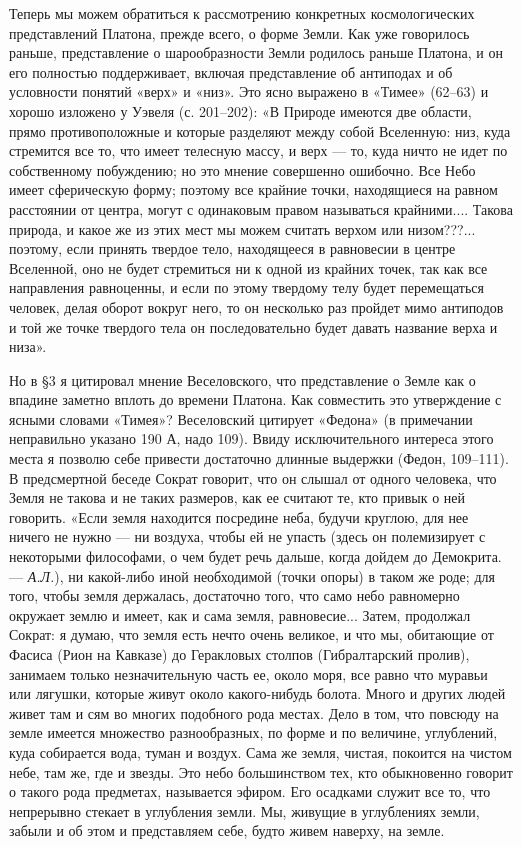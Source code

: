Теперь мы  можем обратиться к рассмотрению  конкретных космологических
представлений Платона, прежде всего, о форме Земли. Как уже говорилось
раньше, представление о шарообразности  Земли родилось раньше Платона,
и он его полностью поддерживает,  включая представление об антиподах и
об  условности понятий  «верх» и  «низ». Это  ясно выражено  в «Тимее»
(62--63) и хорошо изложено у  Уэвеля (с. 201--202): «В Природе имеются
две  области, прямо  противоположные и  которые разделяют  между собой
Вселенную: низ,  куда стремится  все то, что  имеет телесную  массу, и
верх ---  то, куда ничто  не идет  по собственному побуждению;  но это
мнение совершенно ошибочно. Все  Небо имеет сферическую форму; поэтому
все крайние точки, находящиеся на равном расстоянии от центра, могут с
одинаковым правом  называться крайними.... Такова природа,  и какое же
из этих  мест мы  можем считать верхом  или низом???...  поэтому, если
принять  твердое тело,  находящееся в  равновесии в  центре Вселенной,
оно  не  будет  стремиться  ни  к одной  из  крайних  точек,  так  как
все  направления  равноценны, и  если  по  этому твердому  телу  будет
перемещаться человек,  делая оборот вокруг  него, то он  несколько раз
пройдет мимо антиподов и той же точке твердого тела он последовательно
будет давать название верха и низа».

Но в §3 я цитировал мнение Веселовского, что представление о Земле как
о  впадине  заметно вплоть  до  времени  Платона. Как  совместить  это
утверждение с ясными словами «Тимея»? Веселовский цитирует «Федона» (в
примечании неправильно указано 190 А, надо 109). Ввиду исключительного
интереса  этого  места  я  позволю себе  привести  достаточно  длинные
выдержки (Федон, 109--111). В  предсмертной беседе Сократ говорит, что
он слышал от одного человека, что Земля не такова и не таких размеров,
как ее  считают те, кто привык  о ней говорить. «Если  земля находится
посредине  неба,  будучи круглою,  для  нее  ничего  не нужно  ---  ни
воздуха,  чтобы  ей не  упасть  (здесь  он полемизирует  с  некоторыми
философами, о  чем будет речь  дальше, когда дойдем до  Демокрита. ---
\emph{А.Л.}), ни какой-либо иной необходимой  (точки опоры) в таком же
роде; для того, чтобы земля  держалась, достаточно того, что само небо
равномерно окружает  землю и  имеет, как  и сама  земля, равновесие...
Затем, продолжал Сократ: я думаю,  что земля есть нечто очень великое,
и что мы, обитающие от Фасиса  (Рион на Кавказе) до Геракловых столпов
(Гибралтарский  пролив),  занимаем  только  незначительную  часть  ее,
около моря,  все равно  что муравьи или  лягушки, которые  живут около
какого-нибудь болота. Много  и других людей живет там и  сям во многих
подобного  рода местах.  Дело  в  том, что  повсюду  на земле  имеется
множество  разнообразных, по  форме  и по  величине, углублений,  куда
собирается вода,  туман и воздух.  Сама же земля, чистая,  покоится на
чистом небе,  там же,  где и  звезды. Это  небо большинством  тех, кто
обыкновенно говорит  о такого  рода предметах, называется  эфиром. Его
осадками служит все то, что непрерывно стекает в углубления земли. Мы,
живущие в  углублениях земли,  забыли и об  этом и  представляем себе,
будто живем наверху, на земле.


